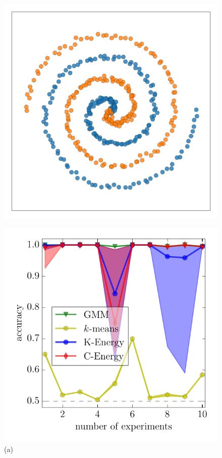 \documentclass{article}
\begin{document}
\begin{figure}
\begin{minipage}{0.33\textwidth}
\hspace{.7cm}\includegraphics[width=.82\textwidth]{spirals_data.pdf}
\end{minipage}
\begin{minipage}{0.33\textwidth}
\centering
\includegraphics[width=\textwidth]{cigars.pdf}\\[-.8em]
(a)
\end{minipage}

\end{figure}
\end{document}
